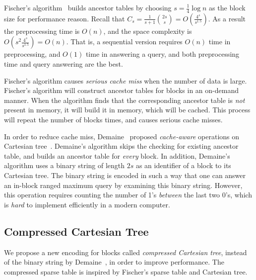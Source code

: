 Fischer's algorithm~\cite{Fischer2006TheoreticalAP} builds ancestor
tables by choosing $s = \frac{1}{4} \log n$ as the block size for
performance reason.  Recall that $C_s = \frac{1}{s+1}\binom{2s}{s} =
O(\frac{4^s}{s^{1.5}})$.  As a result the preprocessing time is
$O(n)$, and the space complexity is $O(s^2 \frac{4^s}{s^{1.5}}) =
O(n)$.  That is, a sequential version requires $O(n)$ time in
preprocessing, and $O(1)$ time in answering a query, and both
preprocessing time and query answering are the best.

Fischer's algorithm causes {\em serious cache miss} when the number of
data is large.  Fischer's algorithm will construct ancestor tables for
blocks in an on-demand manner.  When the algorithm finds that the
corresponding ancestor table is {\em not} present in memory, it will
build it in memory, which will be cached.  This process will repeat
the number of blocks times, and causes serious cache misses.

In order to reduce cache miss, Demaine~\cite{Demaine2009OnCT} proposed
{\em cache-aware} operations on Cartesian
tree~\cite{Vuillemin1980AUL}.  Demaine's algorithm skips the checking
for existing ancestor table, and builds an ancestor table for {\em
  every} block.  In addition, Demaine's algorithm uses a binary string
of length $2s$ as an identifier of a block to its Cartesian tree.  The
binary string is encoded in such a way that one can answer an in-block
ranged maximum query by examining this binary string.  However, this
operation requires counting the number of 1's {\em between} the last
two 0's, which is {\em hard} to implement efficiently in a modern
computer.


\subsection{Compressed Cartesian Tree} \label{sec:cct}

We propose a new encoding for blocks called {\em compressed Cartesian
  tree}, instead of the binary string by
Demaine~\cite{Demaine2009OnCT}, in order to improve performance.  The
compressed sparse table is inspired by Fischer's sparse table and
Cartesian tree.

